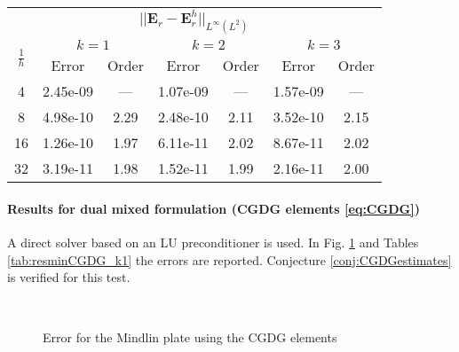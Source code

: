 \begin{table}[hp]
	\centering
	\begin{tabular}{ccccccc}
		\hline 
		\multicolumn{7}{c}{$||\bm{E}_r - \bm{E}_r^h||_{L^{\infty}(L^2)}$} \\
		\multirow{2}{*}{$\frac{1}{h}$} & \multicolumn{2}{c}{$k=1$}    & \multicolumn{2}{c}{$k=2$} & \multicolumn{2}{c}{$k=3$}   \\ 
		& Error & Order  & Error & Order  & Error & Order \\ 
		\hline 
		4  & 2.45e-09 & ---  & 1.07e-09 & ---  & 1.57e-09 & ---  \\ 
		8  & 4.98e-10 & 2.29 & 2.48e-10 & 2.11 & 3.52e-10 & 2.15 \\ 
		16 & 1.26e-10 & 1.97 & 6.11e-11 & 2.02 & 8.67e-11 & 2.02 \\ 
		32 & 3.19e-11 & 1.98 & 1.52e-11 & 1.99 & 2.16e-11 & 2.00 \\ 
		\hline 
	\end{tabular} 
	\captionsetup{width=0.95\linewidth}
	\vspace{1mm}
	\label{tab:resminAFW_r}
\end{table}


\paragraph{Results for dual mixed formulation (CGDG elements \eqref{eq:CGDG})}
A direct solver based on an LU preconditioner is used.
In Fig. \ref{fig:errorCGDG} and Tables \ref{tab:resminCGDG_k1} the errors are reported. Conjecture \ref{conj:CGDGestimates} is verified for this test. 

\begin{figure}[h!t]%
	\centering
	\hspace{8pt}%
	 \\
	\hspace{8pt}%
	\caption{Error for the Mindlin plate using the CGDG elements}%
	\label{fig:errorCGDG}%
\end{figure}


